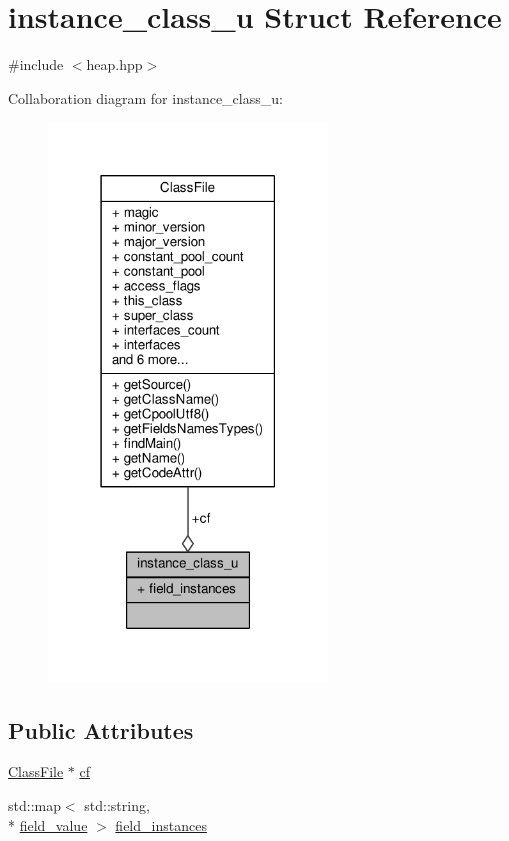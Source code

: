 \hypertarget{structinstance__class__u}{\section{instance\+\_\+class\+\_\+u Struct Reference}
\label{structinstance__class__u}
}


{\ttfamily \#include $<$heap.\+hpp$>$}



Collaboration diagram for instance\+\_\+class\+\_\+u\+:\nopagebreak
\begin{figure}[H]
\begin{center}
\leavevmode
\includegraphics[width=210pt]{structinstance__class__u__coll__graph}
\end{center}
\end{figure}
\subsection*{Public Attributes}
\begin{DoxyCompactItemize}
\item 
\hyperlink{classClassFile}{Class\+File} $\ast$ \hyperlink{structinstance__class__u_a0ff637ba668f3c4a4d144c3de64eb85b}{cf}
\item 
std\+::map$<$ std\+::string, \\*
\hyperlink{heap_8hpp_a62578fb07ad4db0a96588554c6ed60b2}{field\+\_\+value} $>$ \hyperlink{structinstance__class__u_af190ac0f8c491ac92da5c237cb7dfc26}{field\+\_\+instances}
\end{DoxyCompactItemize}



